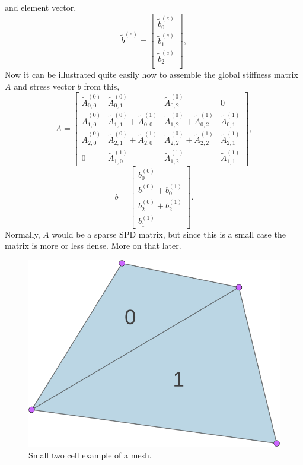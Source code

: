 and element vector,
\begin{equation}\label{elemvec}
	\widetilde{b}^{(e)} =
	\left[\begin{matrix}
		\widetilde{b}^{(e)}_0 \\
		\widetilde{b}^{(e)}_1 \\
		\widetilde{b}^{(e)}_2 \\
	\end{matrix}\right],
\end{equation}
Now it can be illustrated quite easily how to assemble the global stiffness matrix $A$ and stress vector $b$ from this,
\begin{equation}
	A =
	\left[\begin{matrix} 
		\widetilde{A}^{(0)}_{0,0} & \widetilde{A}^{(0)}_{0,1} & \widetilde{A}^{(0)}_{0,2} & 0 \\
		\widetilde{A}^{(0)}_{1,0} & \widetilde{A}^{(0)}_{1,1} + \widetilde{A}^{(1)}_{0,0}  & \widetilde{A}^{(0)}_{1,2} + \widetilde{A}^{(1)}_{0,2} & \widetilde{A}^{(1)}_{0,1} \\
		\widetilde{A}^{(0)}_{2,0} & \widetilde{A}^{(0)}_{2,1} + \widetilde{A}^{(1)}_{2,0} & \widetilde{A}^{(0)}_{2,2} + \widetilde{A}^{(1)}_{2,2} & \widetilde{A}^{(1)}_{2,1} \\
		0 & \widetilde{A}^{(1)}_{1,0} & \widetilde{A}^{(1)}_{1,2} & \widetilde{A}^{(1)}_{1,1}
	\end{matrix}\right],
\end{equation}
\begin{equation}
	b =
	\left[\begin{matrix}
		b^{(0)}_0 \\
		b^{(0)}_1 + b^{(1)}_0 \\
		b^{(0)}_2 + b^{(1)}_2 \\
		b^{(1)}_1
	\end{matrix}\right].
\end{equation}
Normally, $A$ would be a sparse SPD matrix, but since this is a small case the matrix is more or less dense. More on that later.
\begin{figure}
	\centering
	\includegraphics[width = 0.35\linewidth]{Figures/2cell.png}
	\caption{Small two cell example of a mesh.}
	\label{fig:2cell}
\end{figure}
